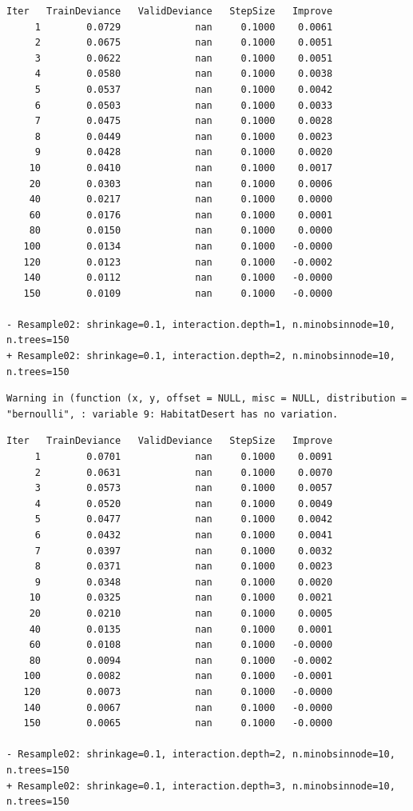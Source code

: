 \documentclass[
  letterpaper,
  DIV=11,
  numbers=noendperiod]{scrartcl}
\begin{document}
\begin{verbatim}
Iter   TrainDeviance   ValidDeviance   StepSize   Improve
     1        0.0729             nan     0.1000    0.0061
     2        0.0675             nan     0.1000    0.0051
     3        0.0622             nan     0.1000    0.0051
     4        0.0580             nan     0.1000    0.0038
     5        0.0537             nan     0.1000    0.0042
     6        0.0503             nan     0.1000    0.0033
     7        0.0475             nan     0.1000    0.0028
     8        0.0449             nan     0.1000    0.0023
     9        0.0428             nan     0.1000    0.0020
    10        0.0410             nan     0.1000    0.0017
    20        0.0303             nan     0.1000    0.0006
    40        0.0217             nan     0.1000    0.0000
    60        0.0176             nan     0.1000    0.0001
    80        0.0150             nan     0.1000    0.0000
   100        0.0134             nan     0.1000   -0.0000
   120        0.0123             nan     0.1000   -0.0002
   140        0.0112             nan     0.1000   -0.0000
   150        0.0109             nan     0.1000   -0.0000

- Resample02: shrinkage=0.1, interaction.depth=1, n.minobsinnode=10, n.trees=150 
+ Resample02: shrinkage=0.1, interaction.depth=2, n.minobsinnode=10, n.trees=150 
\end{verbatim}

\begin{verbatim}
Warning in (function (x, y, offset = NULL, misc = NULL, distribution =
"bernoulli", : variable 9: HabitatDesert has no variation.
\end{verbatim}

\begin{verbatim}
Iter   TrainDeviance   ValidDeviance   StepSize   Improve
     1        0.0701             nan     0.1000    0.0091
     2        0.0631             nan     0.1000    0.0070
     3        0.0573             nan     0.1000    0.0057
     4        0.0520             nan     0.1000    0.0049
     5        0.0477             nan     0.1000    0.0042
     6        0.0432             nan     0.1000    0.0041
     7        0.0397             nan     0.1000    0.0032
     8        0.0371             nan     0.1000    0.0023
     9        0.0348             nan     0.1000    0.0020
    10        0.0325             nan     0.1000    0.0021
    20        0.0210             nan     0.1000    0.0005
    40        0.0135             nan     0.1000    0.0001
    60        0.0108             nan     0.1000   -0.0000
    80        0.0094             nan     0.1000   -0.0002
   100        0.0082             nan     0.1000   -0.0001
   120        0.0073             nan     0.1000   -0.0000
   140        0.0067             nan     0.1000   -0.0000
   150        0.0065             nan     0.1000   -0.0000

- Resample02: shrinkage=0.1, interaction.depth=2, n.minobsinnode=10, n.trees=150 
+ Resample02: shrinkage=0.1, interaction.depth=3, n.minobsinnode=10, n.trees=150 
\end{verbatim}
\end{document}
